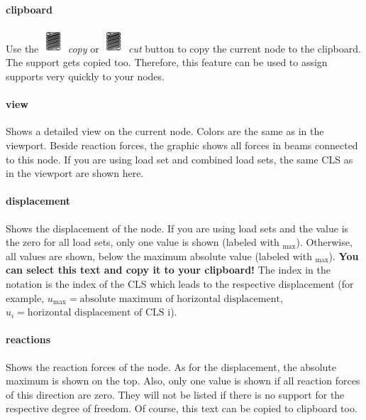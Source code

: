 \documentclass[a4paper,11pt]{report}
\begin{document}
\paragraph{clipboard}
Use the \includegraphics[scale=0.5]{../../icons/spring.png} \textit{copy} or \includegraphics[scale=0.5]{../../icons/spring.png} \textit{cut} button to copy the current node to the clipboard. The support gets copied too. Therefore, this feature can be used to assign supports very quickly to your nodes.

\paragraph{view}
Shows a detailed view on the current node. Colors are the same as in the viewport. Beside reaction forces, the graphic shows all forces in beams connected to this node. If you are using load set and combined load sets, the same CLS as in the viewport are shown here.

\paragraph{displacement}
Shows the displacement of the node. If you are using load sets and the value is the zero for all load sets, only one value is shown (labeled with $_{\max}$). Otherwise, all values are shown, below the maximum absolute value (labeled with $_{\max}$).
\textbf{You can select this text and copy it to your clipboard!} The index in the notation is the index of the CLS which leads to the respective displacement (for example, $u_{\max} = \text{absolute maximum of horizontal displacement}$, $u_{i} = \text{horizontal displacement of CLS i}$).

\paragraph{reactions}
Shows the reaction forces of the node. As for the displacement, the absolute maximum is shown on the top. Also, only one value is shown if all reaction forces of this direction are zero. They will not be listed if there is no support for the respective degree of freedom. Of course, this text can be copied to clipboard too.
\end{document}
